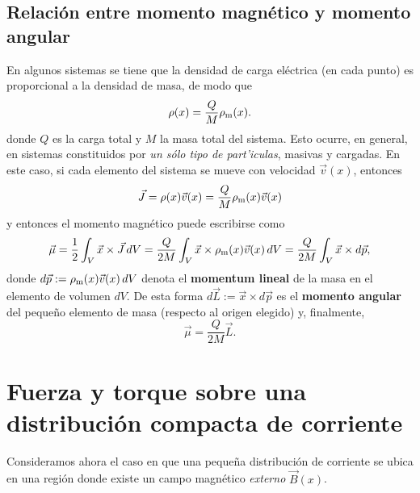 \subsection{Relación entre momento magnético y momento angular}
En algunos sistemas se tiene que la densidad de carga eléctrica (en cada
punto) es proporcional a la densidad de masa, de modo que
\begin{equation}
 \rho(x)=\frac{Q}{M} \rho_{\rm m}(x).
\end{equation}
donde $Q$ es la carga total y $M$ la masa total del sistema. Esto ocurre, en
general, en sistemas constituidos por \textit{un sólo tipo de part'iculas},
masivas y cargadas. En este caso, si cada elemento del sistema se mueve
con velocidad $\vec{v}(x)$, entonces
\begin{equation}
\vec{J}=\rho(x)\vec{v}(x)=\frac{Q}{M} \rho_{\rm m}(x)\vec{v}(x)
\end{equation}
y entonces el momento magnético puede escribirse como
\begin{equation}
 \vec{\mu}=\frac{1}{2}\int_V \vec{x}\times\vec{J}\,dV=\frac{Q}{2M}\int_V
\vec{x}\times\rho_{\rm m}(x)\vec{v}(x)\,dV=\frac{Q}{2M}\int_V
\vec{x}\times d\vec{p},
\end{equation}
donde $d\vec{p}:=\rho_{\rm m}(x)\vec{v}(x)\,dV$ denota el \textbf{momentum lineal} de la masa en el elemento de volumen $dV$. De esta forma $d\vec{L}:=\vec{x}\times d\vec{p}$ es el \textbf{momento angular} del peque\~no elemento de masa (respecto al origen elegido) y, finalmente,
\begin{equation}
 \boxed{\vec{\mu}=\frac{Q}{2M}\vec{L}.}
\end{equation}

\section{Fuerza y torque sobre una distribución compacta de corriente}
Consideramos ahora el caso en que una peque\~na distribución de corriente
se ubica en una región donde existe un campo magnético \textit{externo}
$\vec{B}(x)$.

